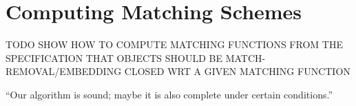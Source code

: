\section{Computing Matching Schemes}
\label{sec:matching}

TODO SHOW HOW TO COMPUTE MATCHING FUNCTIONS FROM THE SPECIFICATION THAT OBJECTS
SHOULD BE MATCH-REMOVAL/EMBEDDING CLOSED WRT A GIVEN MATCHING FUNCTION

\begin{theorem}
  “Our algorithm is sound; maybe it is also complete under certain conditions.”
\end{theorem}
